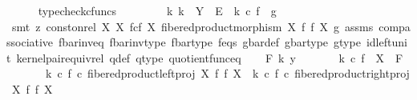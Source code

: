 \begin{isabellebody}
\ \ \ \ \isamarkupfalse%
\ typecheck{\isacharunderscore}{\kern0pt}cfuncs\ \ \ \isanewline
\ \ \isamarkupfalse%
\ \isamarkupfalse%
\ {\isachardoublequoteopen}{\isasymexists}k{\isachardot}{\kern0pt}\ k\ {\isacharcolon}{\kern0pt}\ Y\ {\isasymrightarrow}\ E\ {\isasymand}\ k\ {\isasymcirc}\isactrlsub c\ f\ {\isacharequal}{\kern0pt}\ g{\isachardoublequoteclose}\isanewline
\ \ \ \ \isamarkupfalse%
\ {\isacharparenleft}{\kern0pt}smt\ {\isacharparenleft}{\kern0pt}z{}{\isacharparenright}{\kern0pt}\ {\isacartoucheopen}const{\isacharunderscore}{\kern0pt}on{\isacharunderscore}{\kern0pt}rel\ X\ {\isacharparenleft}{\kern0pt}X\ \isactrlbsub f\isactrlesub {\isasymtimes}\isactrlsub c\isactrlbsub f\isactrlesub \ X{\isacharcomma}{\kern0pt}\ fibered{\isacharunderscore}{\kern0pt}product{\isacharunderscore}{\kern0pt}morphism\ X\ f\ f\ X{\isacharparenright}{\kern0pt}\ g{\isacartoucheclose}\ assms{\isacharparenleft}{\kern0pt}{}{\isacharparenright}{\kern0pt}\ comp{\isacharunderscore}{\kern0pt}associative{}\ f{\isacharunderscore}{\kern0pt}bar{\isacharunderscore}{\kern0pt}inv{\isacharunderscore}{\kern0pt}eq{}\ f{\isacharunderscore}{\kern0pt}bar{\isacharunderscore}{\kern0pt}inv{\isacharunderscore}{\kern0pt}type\ f{\isacharunderscore}{\kern0pt}bar{\isacharunderscore}{\kern0pt}type\ f{\isacharunderscore}{\kern0pt}eqs\ g{\isacharunderscore}{\kern0pt}bar{\isacharunderscore}{\kern0pt}def\ g{\isacharunderscore}{\kern0pt}bar{\isacharunderscore}{\kern0pt}type\ g{\isacharunderscore}{\kern0pt}type\ id{\isacharunderscore}{\kern0pt}left{\isacharunderscore}{\kern0pt}unit{}\ kernel{\isacharunderscore}{\kern0pt}pair{\isacharunderscore}{\kern0pt}equiv{\isacharunderscore}{\kern0pt}rel\ q{\isacharunderscore}{\kern0pt}def\ q{\isacharunderscore}{\kern0pt}type\ quotient{\isacharunderscore}{\kern0pt}func{\isacharunderscore}{\kern0pt}eq{\isacharparenright}{\kern0pt}\isanewline
{}\isamarkupfalse%
\isanewline
\ \ \isamarkupfalse%
\ {\isachardoublequoteopen}{\isasymAnd}F\ k\ y{\isachardot}{\kern0pt}\isanewline
\ \ \ \ \ \ \ k\ {\isasymcirc}\isactrlsub c\ f\ {\isacharcolon}{\kern0pt}\ X\ {\isasymrightarrow}\ F\ {\isasymLongrightarrow}\isanewline
\ \ \ \ \ \ \ {\isacharparenleft}{\kern0pt}k\ {\isasymcirc}\isactrlsub c\ f{\isacharparenright}{\kern0pt}\ {\isasymcirc}\isactrlsub c\ fibered{\isacharunderscore}{\kern0pt}product{\isacharunderscore}{\kern0pt}left{\isacharunderscore}{\kern0pt}proj\ X\ f\ f\ X\ {\isacharequal}{\kern0pt}\ {\isacharparenleft}{\kern0pt}k\ {\isasymcirc}\isactrlsub c\ f{\isacharparenright}{\kern0pt}\ {\isasymcirc}\isactrlsub c\ fibered{\isacharunderscore}{\kern0pt}product{\isacharunderscore}{\kern0pt}right{\isacharunderscore}{\kern0pt}proj\ X\ f\ f\ X\ {\isasymLongrightarrow}\isanewline

\end{isabellebody}
